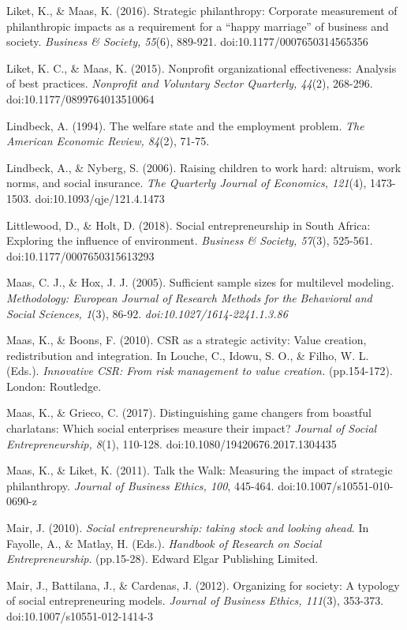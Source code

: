 \documentclass{article}
\begin{document}
Liket, K., \& Maas, K. (2016). Strategic philanthropy: Corporate measurement of philanthropic impacts as a requirement for a “happy marriage” of business and society. \emph{Business \& Society, 55}(6), 889-921. doi:10.1177/0007650314565356

Liket, K. C., \& Maas, K. (2015). Nonprofit organizational effectiveness: Analysis of best practices. \emph{Nonprofit}\emph{ and Voluntary Sector Quarterly, 44}(2), 268-296. doi:10.1177/0899764013510064

Lindbeck, A. (1994). The welfare state and the employment problem. \emph{The American Economic Review, 84}(2), 71-75. 

Lindbeck, A., \& Nyberg, S. (2006). Raising children to work hard: altruism, work norms, and social insurance. \emph{The Quarterly Journal of Economics, 121}(4), 1473-1503. doi:10.1093/qje/121.4.1473

Littlewood, D., \& Holt, D. (2018). Social entrepreneurship in South Africa: Exploring the influence of environment. \emph{Business \& Society, 57}(3), 525-561. doi:10.1177/0007650315613293

Maas, C. J., \& Hox, J. J. (2005). Sufficient sample sizes for multilevel modeling. \emph{Methodology: European Journal of Research Methods for the }\emph{Behavioral}\emph{ and Social Sciences, 1}(3), 86-92. \emph{doi:10.1027/1614-2241.1.3.86}

Maas, K., \& Boons, F. (2010). CSR as a strategic activity: Value creation, redistribution and integration. In Louche, C., Idowu, S. O., \& Filho, W. L. (Eds.). \emph{Innovative CSR: From risk management to value creation. }(pp.154-172). London: Routledge. 

Maas, K., \& Grieco, C. (2017). Distinguishing game changers from boastful charlatans: Which social enterprises measure their impact? \emph{Journal of Social Entrepreneurship, 8}(1), 110-128. doi:10.1080/19420676.2017.1304435

Maas, K., \& Liket, K. (2011). Talk the Walk: Measuring the impact of strategic philanthropy. \emph{Journal of Business Ethics, 100}, 445-464. doi:10.1007/s10551-010-0690-z

Mair, J. (2010). \emph{Social entrepreneurship: taking stock and looking ahead}. In Fayolle, A., \& Matlay, H. (Eds.). \emph{Handbook of Research on Social Entrepreneurship}. (pp.15-28). Edward Elgar Publishing Limited.

Mair, J., Battilana, J., \& Cardenas, J. (2012). Organizing for society: A typology of social entrepreneuring models. \emph{Journal of Business Ethics, 111}(3), 353-373. doi:10.1007/s10551-012-1414-3
\end{document}
